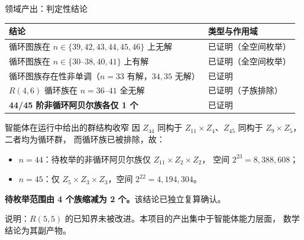 \documentclass[aspectratio=169,11pt]{beamer}
\begin{document}
\begin{frame}{领域产出：判定性结论}
  \begin{center}
  \scriptsize
  \begin{tabular}{@{}p{}p{}@{}}
    \toprule
    \textbf{结论} & \textbf{类型与作用域} \\
    \midrule
    循环图族在 $n\in\{39,42,43,44,45,46\}$ 上无解 & 已证明（全空间枚举） \\
    循环图族在 $n\in\{30\text{--}38,40,41\}$ 上有解 & 已证明（全空间枚举） \\
    循环图族存在性非单调（$n=33$ 有解，$34,35$ 无解） & 已证明 \\
    $R(4,6)$ 循环族在 $n=36\text{--}41$ 全无解 & 已证明（子族排除） \\
    \textbf{44/45 阶非循环阿贝尔族各仅 1 个} & 已证明 \\
    \bottomrule
  \end{tabular}
  \end{center}

  \vspace{0.6em}
  \begin{block}{智能体在运行中给出的群结构收窄}
    \footnotesize
    因 $Z_{44}$ 同构于 $Z_{11}\times Z_4$、$Z_{45}$ 同构于 $Z_9\times Z_5$，二者均为循环群，
    而循环族已被排除，故：
    \begin{itemize}
      \item $n=44$：待枚举的非循环阿贝尔族仅 $Z_{11}\times Z_2\times Z_2$，
        空间 $2^{23}=8{,}388{,}608$；
      \item $n=45$：仅 $Z_5\times Z_3\times Z_3$，空间 $2^{22}=4{,}194{,}304$。
    \end{itemize}
    \textbf{待枚举范围由 4 个族缩减为 2 个。}该结论已独立复算确认。
  \end{block}

  \vspace{0.2em}
  \footnotesize\color{black!65}
  说明：$R(5,5)$ 的已知界未被改进。本项目的产出集中于智能体能力层面，
  数学结论为其副产物。
\end{frame}
\end{document}
